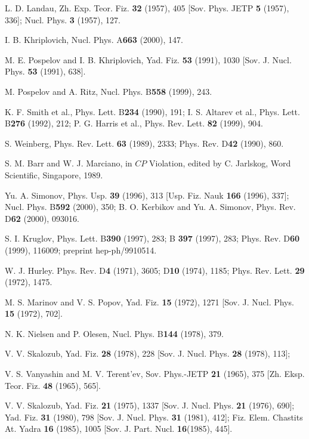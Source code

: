 \documentclass[a4paper,12pt]{article}
\begin{document}
\begin{thebibliography}{99}
\bibitem{}  L. D. Landau, Zh. Exp. Teor. Fiz. \textbf{32} (1957), 405 [Sov.
Phys. JETP \textbf{5} (1957), 336]; Nucl. Phys. \textbf{3} (1957), 127.

\bibitem{}  I. B. Khriplovich, Nucl. Phys. A\textbf{663} (2000), 147.

\bibitem{}  M. E. Pospelov and I. B. Khriplovich, Yad. Fiz. \textbf{53}
(1991), 1030 [Sov. J. Nucl. Phys. \textbf{53} (1991), 638].

\bibitem{}  M. Pospelov and A. Ritz, Nucl. Phys. B\textbf{558} (1999), 243.

\bibitem{}  K. F. Smith et al., Phys. Lett. B\textbf{234} (1990), 191; I. S.
Altarev et al., Phys. Lett. B\textbf{276} (1992), 212; P. G. Harris et al.,
Phys. Rev. Lett. \textbf{82} (1999), 904.

\bibitem{}  S. Weinberg, Phys. Rev. Lett. \textbf{63} (1989), 2333; Phys.
Rev. D\textbf{42} (1990), 860.

\bibitem{}  S. M. Barr and W. J. Marciano, in $CP$ Violation, edited by C.
Jarlskog, Word Scientific, Singapore, 1989.

\bibitem{}  Yu. A. Simonov, Phys. Usp. \textbf{39} (1996), 313 [Usp. Fiz.
Nauk \textbf{166} (1996), 337]; Nucl. Phys. B\textbf{592} (2000), 350; B. O.
Kerbikov and Yu. A. Simonov, Phys. Rev. D\textbf{62} (2000), 093016.

\bibitem{}  S. I. Kruglov, Phys. Lett. B\textbf{390} (1997), 283; B\textbf{
397} (1997), 283; Phys. Rev. D\textbf{60} (1999), 116009; preprint
hep-ph/9910514.

\bibitem{}  W. J. Hurley. Phys. Rev. D\textbf{4} (1971), 3605; D\textbf{10}
(1974), 1185; Phys. Rev. Lett. \textbf{29} (1972), 1475.

\bibitem{}  M. S. Marinov and V. S. Popov, Yad. Fiz. \textbf{15} (1972),
1271 [Sov. J. Nucl. Phys. \textbf{15} (1972), 702].

\bibitem{}  N. K. Nielsen and P. Olesen, Nucl. Phys. B\textbf{144} (1978),
379.

\bibitem{}  V. V. Skalozub, Yad. Fiz. \textbf{28} (1978), 228 [Sov. J. Nucl.
Phys. \textbf{28} (1978), 113];

\bibitem{}  V. S. Vanyashin and M. V. Terent'ev, Sov. Phys.-JETP \textbf{21}
(1965), 375 [Zh. Eksp. Teor. Fiz. \textbf{48} (1965), 565].

\bibitem{}  V. V. Skalozub, Yad. Fiz. \textbf{21} (1975), 1337 [Sov. J.
Nucl. Phys. \textbf{21} (1976), 690]; Yad. Fiz. \textbf{31 }(1980), 798
[Sov. J. Nucl. Phys. \textbf{31} (1981), 412]; Fiz. Elem. Chastits At. Yadra
\textbf{16} (1985), 1005 [Sov. J. Part. Nucl. \textbf{16}(1985), 445].


\end{thebibliography}
\end{document}
